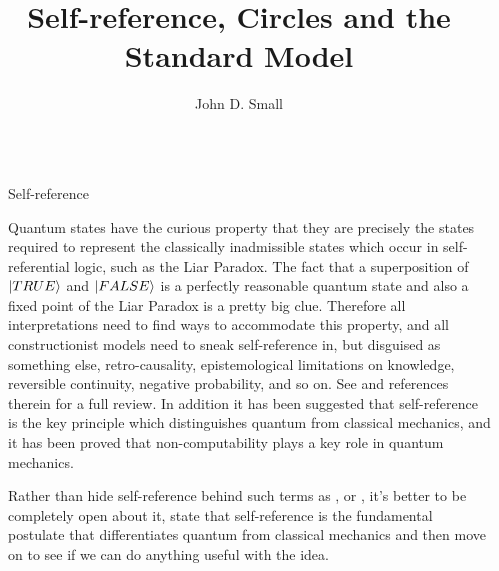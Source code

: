 \documentclass[final]{beamer}
\title{Self-reference, Circles and the Standard Model}
\author{John D. Small}
\newlength{\sepwidth}
\newlength{\colwidth}
\newcommand{\separatorcolumn}{\begin{column}{\sepwidth}\end{column}}
\begin{document}
\begin{frame}[t]
\begin{columns}[t]
\separatorcolumn

\begin{column}{\colwidth}

  \begin{block}{Self-reference}

    Quantum states have the curious property that they are precisely the states required to represent the classically inadmissible states which occur in self-referential logic, such as the Liar Paradox. The fact that a superposition of $\ket{TRUE}$ and $\ket{FALSE}$ is a perfectly reasonable quantum state and also a fixed point of the Liar Paradox is a pretty big clue. Therefore all interpretations need to find ways to accommodate this property, and all constructionist models need to sneak self-reference in, but disguised as something else, retro-causality, epistemological limitations on knowledge, reversible continuity, negative probability, and so on. See \autocite{svozil_k_2018} and references therein for a full review. In addition it has been suggested that self-reference is the key principle which distinguishes quantum from classical mechanics, \autocite{Wheeler1974, szangolies_j_2018, Realpe-Gomez2020} and it has been proved \autocite{bendersky_non_computable_2016,calude_value_indefiniteness_2006} that non-computability plays a key role  in quantum mechanics.
    \par
    Rather than hide self-reference behind such terms as ,  or ,  it's better to be completely open about it, state that self-reference is the fundamental postulate that differentiates quantum from classical mechanics and then move on to see if we can do anything useful with the idea.
  \end{block}


\end{column}
\end{columns}
\end{frame}
\end{document}
